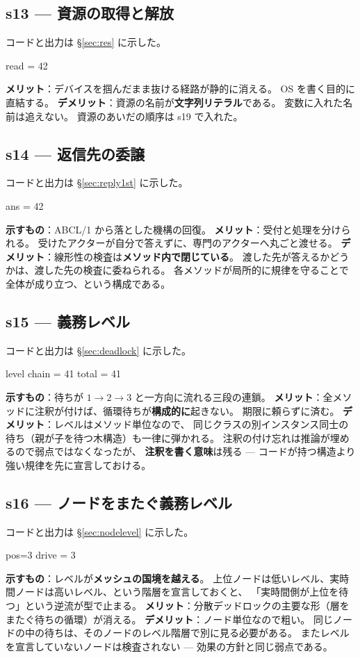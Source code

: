 \documentclass[11pt,a4paper]{ltjsarticle}
\theoremstyle{definition}
\theoremstyle{remark}
\begin{document}
\subsection{s13 --- 資源の取得と解放}
コードと出力は \S\ref{sec:res} に示した。
\begin{term}
read = 42
\end{term}
\textbf{メリット}：デバイスを掴んだまま抜ける経路が静的に消える。
OS を書く目的に直結する。
\textbf{デメリット}：資源の名前が\textbf{文字列リテラル}である。
変数に入れた名前は追えない。
資源のあいだの順序は s19 で入れた。

\subsection{s14 --- 返信先の委譲}
コードと出力は \S\ref{sec:reply1st} に示した。
\begin{term}
ans = 42
\end{term}
\textbf{示すもの}：ABCL/1 から落とした機構の回復。
\textbf{メリット}：受付と処理を分けられる。
受けたアクターが自分で答えずに、専門のアクターへ丸ごと渡せる。
\textbf{デメリット}：線形性の検査は\textbf{メソッド内で閉じている}。
渡した先が答えるかどうかは、渡した先の検査に委ねられる。
各メソッドが局所的に規律を守ることで全体が成り立つ、という構成である。

\subsection{s15 --- 義務レベル}
コードと出力は \S\ref{sec:deadlock} に示した。
\begin{term}
level chain = 41
total = 41
\end{term}
\textbf{示すもの}：待ちが $1 \to 2 \to 3$ と一方向に流れる三段の連鎖。
\textbf{メリット}：全メソッドに注釈が付けば、循環待ちが\textbf{構成的に}起きない。
期限に頼らずに済む。
\textbf{デメリット}：レベルはメソッド単位なので、
同じクラスの別インスタンス同士の待ち（親が子を待つ木構造）も一律に弾かれる。
注釈の付け忘れは推論が埋めるので弱点ではなくなったが、
\textbf{注釈を書く意味}は残る --- コードが持つ構造より強い規律を先に宣言しておける。

\subsection{s16 --- ノードをまたぐ義務レベル}
コードと出力は \S\ref{sec:nodelevel} に示した。
\begin{term}
pos=3
drive = 3
\end{term}
\textbf{示すもの}：レベルが\textbf{メッシュの国境を越える}。
上位ノードは低いレベル、実時間ノードは高いレベル、という階層を宣言しておくと、
「実時間側が上位を待つ」という逆流が型で止まる。
\textbf{メリット}：分散デッドロックの主要な形（層をまたぐ待ちの循環）が消える。
\textbf{デメリット}：ノード単位なので粗い。
同じノードの中の待ちは、そのノードのレベル階層で別に見る必要がある。
またレベルを宣言していないノードは検査されない --- 効果の方針と同じ弱点である。
\end{document}
